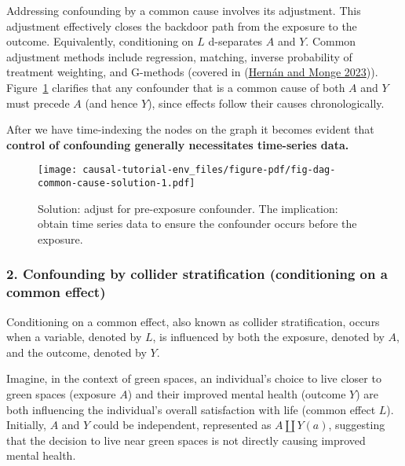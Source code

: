 \documentclass[
  singlecolumn]{article}
\begin{document}
Addressing confounding by a common cause involves its adjustment. This
adjustment effectively closes the backdoor path from the exposure to the
outcome. Equivalently, conditioning on \(L\) d-separates \(A\) and
\(Y\). Common adjustment methods include regression, matching, inverse
probability of treatment weighting, and G-methods (covered in
(\protect\hyperlink{ref-hernuxe1n2023}{Hernán and Monge 2023})).
Figure~\ref{fig-dag-common-cause-solution} clarifies that any confounder
that is a common cause of both \(A\) and \(Y\) must precede \(A\) (and
hence \(Y\)), since effects follow their causes chronologically.

After we have time-indexing the nodes on the graph it becomes evident
that \textbf{control of confounding generally necessitates time-series
data.}

\begin{figure}

{\centering \texttt{[image: causal-tutorial-env\_files/figure-pdf/fig-dag-common-cause-solution-1.pdf]}

}

\caption{\label{fig-dag-common-cause-solution}Solution: adjust for
pre-exposure confounder. The implication: obtain time series data to
ensure the confounder occurs before the exposure.}

\end{figure}

\hypertarget{confounding-by-collider-stratification-conditioning-on-a-common-effect}{%
\subsubsection{2. Confounding by collider stratification (conditioning
on a common
effect)}\label{confounding-by-collider-stratification-conditioning-on-a-common-effect}}

Conditioning on a common effect, also known as collider stratification,
occurs when a variable, denoted by \(L\), is influenced by both the
exposure, denoted by \(A\), and the outcome, denoted by \(Y\).

Imagine, in the context of green spaces, an individual's choice to live
closer to green spaces (exposure \(A\)) and their improved mental health
(outcome \(Y\)) are both influencing the individual's overall
satisfaction with life (common effect \(L\)). Initially, \(A\) and \(Y\)
could be independent, represented as \(A \coprod Y(a)\), suggesting that
the decision to live near green spaces is not directly causing improved
mental health.
\end{document}
